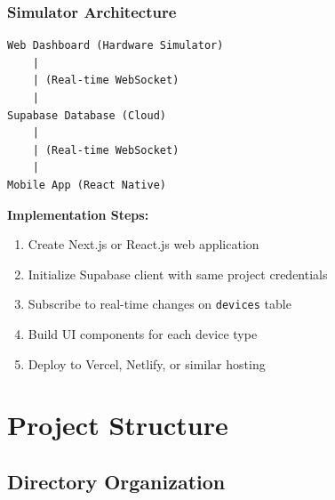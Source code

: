 \documentclass[12pt,a4paper]{article}
\begin{document}
\subsubsection{Simulator Architecture}
\begin{verbatim}
Web Dashboard (Hardware Simulator)
    |
    | (Real-time WebSocket)
    |
Supabase Database (Cloud)
    |
    | (Real-time WebSocket)
    |
Mobile App (React Native)
\end{verbatim}

\textbf{Implementation Steps:}
\begin{enumerate}
    \item Create Next.js or React.js web application
    \item Initialize Supabase client with same project credentials
    \item Subscribe to real-time changes on \texttt{devices} table
    \item Build UI components for each device type
    \item Deploy to Vercel, Netlify, or similar hosting
\end{enumerate}


\newpage
\section{Project Structure}

\subsection{Directory Organization}
\end{document}
